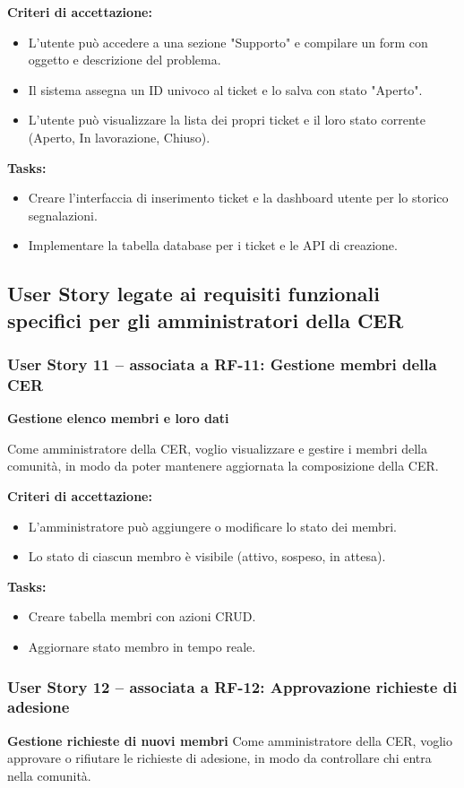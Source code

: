 \textbf{Criteri di accettazione:}
\begin{itemize}
    \item L'utente può accedere a una sezione "Supporto" e compilare un form con oggetto e descrizione del problema.
    \item Il sistema assegna un ID univoco al ticket e lo salva con stato "Aperto".
    \item L'utente può visualizzare la lista dei propri ticket e il loro stato corrente (Aperto, In lavorazione, Chiuso).
\end{itemize}
\textbf{Tasks:}
\begin{itemize}
    \item Creare l'interfaccia di inserimento ticket e la dashboard utente per lo storico segnalazioni.
    \item Implementare la tabella database per i ticket e le API di creazione.
\end{itemize}

\subsection{User Story legate ai requisiti funzionali specifici per gli amministratori della CER}
\subsubsection*{User Story 11 – associata a RF-11: Gestione membri della CER}
\textbf{Gestione elenco membri e loro dati}

Come amministratore della CER, voglio visualizzare e gestire i membri della comunità, in modo da poter mantenere aggiornata la composizione della CER.

\textbf{Criteri di accettazione:}
\begin{itemize}
    \item L’amministratore può aggiungere o modificare lo stato dei membri.
    \item Lo stato di ciascun membro è visibile (attivo, sospeso, in attesa).
\end{itemize}
\textbf{Tasks:}
\begin{itemize}
    \item Creare tabella membri con azioni CRUD.
    \item Aggiornare stato membro in tempo reale.
\end{itemize}
\subsubsection*{User Story 12 – associata a RF-12: Approvazione richieste di adesione}
\textbf{Gestione richieste di nuovi membri}
Come amministratore della CER, voglio approvare o rifiutare le richieste di adesione, in modo da controllare chi entra nella comunità.

